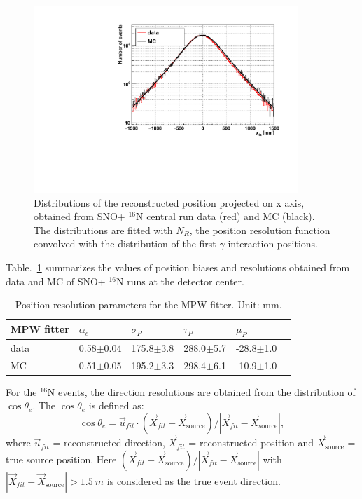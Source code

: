 \documentclass[preprint,12pt]{elsarticle}
\numberwithin{equation}{section}
\begin{document}
\begin{figure}[!htb]
	\centering
	\includegraphics[width=10cm]{posResol.pdf}
	\caption{Distributions of the reconstructed position projected on x axis, obtained from SNO+ {$^{16}$}N central run data (red) and MC (black). The distributions are fitted with $N_R$, the position resolution function convolved with the distribution of the first $\gamma$ interaction positions.}
	\label{posresol}
\end{figure}

Table.~\ref{table_posresol} summarizes the values of position biases and resolutions obtained from data and MC of SNO+ {$^{16}$}N runs at the detector center.
\vspace{2mm}
\begin{table}[ht]
\centering
\caption{Position resolution parameters for the MPW fitter. Unit: mm.}
\label{table_posresol}
\begin{tabular}{|p{2.5cm}|p{2.2cm}|p{2.1cm}|p{2.1cm}|p{2.1cm}| p{2.1cm}|}
\hline
MPW fitter & $\alpha_e$ & $\sigma_P$ &  $\tau_P$ &  $\mu_P$\\
\hline 
data& 0.58$\pm$0.04 & 175.8$\pm$3.8 & 288.0$\pm$5.7 & -28.8$\pm$1.0\\	
\hline 
MC & 0.51$\pm$0.05 & 195.2$\pm$3.3 & 298.4$\pm$6.1 & -10.9$\pm$1.0\\
\hline
\end{tabular}
\end{table}

\vspace{5mm}

For the $^{16}$N events, the direction resolutions are obtained from the distribution of $\cos\theta_e$. The $\cos\theta_e$ is defined as:
\[
\cos\theta_e = \vec{u}_{fit}\cdot (\vec{X}_{fit}-\vec{X}_\mathrm{source})/|\vec{X}_{fit}-\vec{X}_\mathrm{source}|,
\]
where $\vec{u}_{fit}$ = reconstructed direction, $\vec{X}_{fit}$ = reconstructed position and $\vec{X}_\mathrm{source}$ = true source position. Here $(\vec{X}_{fit}-\vec{X}_\mathrm{source})/|\vec{X}_{fit}-\vec{X}_\mathrm{source}|$ with $|\vec{X}_{fit}-\vec{X}_\mathrm{source}|>1.5~m$ is considered as the true event direction.
\end{document}
